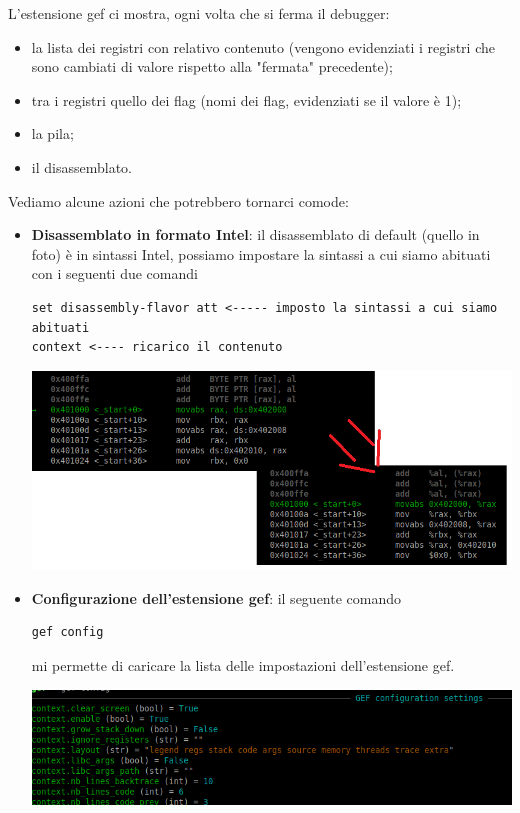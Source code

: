 \documentclass[11pt]{report}
\theoremstyle{definition}
\begin{document}
L'estensione gef ci mostra, ogni volta che si ferma il debugger:
\begin{itemize}
\item la lista dei registri con relativo contenuto (vengono evidenziati i registri che sono cambiati di valore rispetto alla "fermata" precedente);
\item tra i registri quello dei flag (nomi dei flag, evidenziati se il valore è 1);
\item la pila;
\item il disassemblato.
\end{itemize}
Vediamo alcune azioni che potrebbero tornarci comode:
\begin{itemize}
\item \textbf{Disassemblato in formato Intel}: il disassemblato di default (quello in foto) è in sintassi Intel, possiamo impostare la sintassi a cui siamo abituati con i seguenti due comandi
\begin{verbatim}
set disassembly-flavor att <----- imposto la sintassi a cui siamo abituati
context <---- ricarico il contenuto
\end{verbatim}
\begin{center}
	\includegraphics[scale=.9]{img/145.PNG}
\end{center}
\item \textbf{Configurazione dell'estensione gef}: il seguente comando
\begin{verbatim}
gef config
\end{verbatim}
mi permette di caricare la lista delle impostazioni dell'estensione gef.
\begin{center}
	\includegraphics{img/146.PNG}

\end{center}
\end{itemize}
\end{document}
